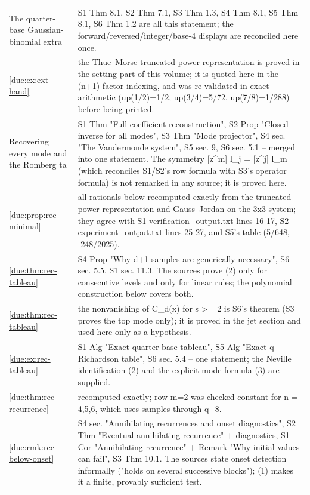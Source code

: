 \documentclass[11pt,oneside]{article}
\theoremstyle{plain}
\theoremstyle{definition}
\theoremstyle{remark}
\begin{document}
\begin{longtable}{@{}p{} p{}@{}}
The quarter-base Gaussian-binomial extra & S1 Thm 8.1, S2 Thm 7.1, S3 Thm 1.3, S4 Thm 8.1, S5 Thm 8.1, S6 Thm 1.2 are all this statement; the forward/reversed/integer/base-4 displays are reconciled here once.\\
\cref{due:ex:ext-hand} & the Thue--Morse truncated-power representation is proved in the setting part of this volume; it is quoted here in the (n+1)-factor indexing, and was re-validated in exact arithmetic (up(1/2)=1/2, up(3/4)=5/72, up(7/8)=1/288) before being printed.\\
Recovering every mode and the Romberg ta & S1 Thm "Full coefficient reconstruction", S2 Prop "Closed inverse for all modes", S3 Thm "Mode projector", S4 sec. "The Vandermonde system", S5 sec. 9, S6 sec. 5.1 -- merged into one statement. The symmetry [z\textasciicircum m] l\_j = [z\textasciicircum j] l\_m (which reconciles S1/S2's row formula with S3's operator formula) is not remarked in any source; it is proved here.\\
\cref{due:prop:rec-minimal} & all rationals below recomputed exactly from the truncated-power representation and Gauss--Jordan on the 3x3 system; they agree with S1 verification\_output.txt lines 16-17, S2 experiment\_output.txt lines 25-27, and S5's table (5/648, -248/2025).\\
\cref{due:thm:rec-tableau} & S4 Prop "Why d+1 samples are generically necessary", S6 sec. 5.5, S1 sec. 11.3. The sources prove (2) only for consecutive levels and only for linear rules; the polynomial construction below covers both.\\
\cref{due:thm:rec-tableau} & the nonvanishing of C\_d(x) for s >= 2 is S6's theorem (S3 proves the top mode only); it is proved in the jet section and used here only as a hypothesis.\\
\cref{due:ex:rec-tableau} & S1 Alg "Exact quarter-base tableau", S5 Alg "Exact q-Richardson table", S6 sec. 5.4 -- one statement; the Neville identification (2) and the explicit mode formula (3) are supplied.\\
\cref{due:thm:rec-recurrence} & recomputed exactly; row m=2 was checked constant for n = 4,5,6, which uses samples through q\_8.\\
\cref{due:rmk:rec-below-onset} & S4 sec. "Annihilating recurrences and onset diagnostics", S2 Thm "Eventual annihilating recurrence" + diagnostics, S1 Cor "Annihilating recurrence" + Remark "Why initial values can fail", S3 Thm 10.1. The sources state onset detection informally ("holds on several successive blocks"); (1) makes it a finite, provably sufficient test.\\

\end{longtable}
\end{document}
